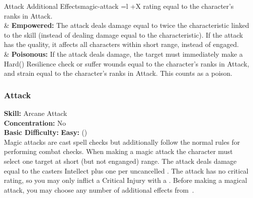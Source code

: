 \begin{table*}[!htb]
\begin{GenesysTable}{Attack Additional Effects}{magic-attack}{ =l +X}
                            rating equal to the character's ranks in Attack.\\
\difficulty\difficulty  & \textbf{Empowered:} The attack deals damage equal to twice the characteristic linked to the skill (instead
                            of dealing damage equal to the characteristic). If the attack has the  quality, it affects
                            all characters within short range, instead of engaged.\\
\difficulty\difficulty  & \textbf{Poisonous:} If the attack deals damage, the target must immediately make a
                            Hard(\difficulty\difficulty\difficulty) Resilience check or suffer wounds equal to the character's
                            ranks in Attack, and strain equal to the character's ranks in Attack. This counts as a poison.\\
\end{GenesysTable}
\end{table*}

\subsubsection{Attack}
\textbf{Skill:} Arcane Attack\\
\textbf{Concentration:} No\\
\textbf{Basic Difficulty:} \textbf{Easy:} (\difficulty)\\
Magic attacks are cast spell checks but additionally follow the normal rules for
performing combat checks. When making a magic attack the character must select
one target at short (but not enganged) range. The attack deals damage equal to
the casters Intellect plus one per uncancelled \success. The attack has no
critical rating, so you may only inflict a Critical Injury with a \triumph.
Before making a magical attack, you may choose any number of additional effects
from~.

